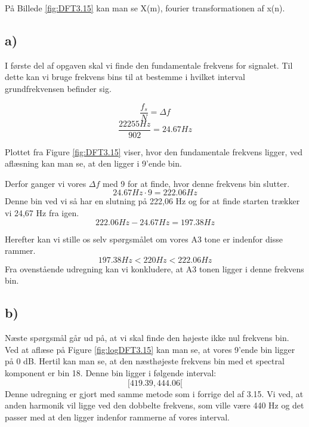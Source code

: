 \documentclass[../main.tex]{subfiles}
\begin{document}
På Billede \ref{fig:DFT3.15} kan man se X(m), fourier transformationen af x(n).

\subsection{a)}
I første del af opgaven skal vi finde den fundamentale frekvens for signalet.
Til dette kan vi bruge frekvens bins til at bestemme i hvilket interval grundfrekvensen befinder sig.

\[
    \frac{f_s}{N} = \Delta f
\]
\[
    \frac{22255 Hz}{902} = 24.67 Hz
\]

Plottet fra Figure \ref{fig:DFT3.15} viser, hvor den fundamentale frekvens ligger, ved aflæsning kan man se, at den ligger i 9'ende bin.

Derfor ganger vi vores $\Delta f$ med 9 for at finde, hvor denne frekvens bin slutter.
\[
    24.67 Hz \cdot 9 = 222.06 Hz
\]
Denne bin ved vi så har en slutning på 222,06 Hz og for at finde starten trækker vi 24,67 Hz fra igen.
\[
    222.06 Hz - 24.67 Hz = 197.38 Hz
\]

Herefter kan vi stille os selv spørgsmålet om vores A3 tone er indenfor disse rammer.
\[
    197.38 Hz < 220 Hz < 222.06 Hz
\]
Fra ovenstående udregning kan vi konkludere, at A3 tonen ligger i denne frekvens bin.

\subsection{b)}


Næste spørgsmål går ud på, at vi skal finde den højeste ikke nul frekvens bin.
Ved at aflæse på Figure \ref{fig:logDFT3.15} kan man se, at vores 9'ende bin ligger på 0 dB. Hertil kan man se, at den næsthøjeste
frekvens bin med et spectral komponent er bin 18. Denne bin ligger i følgende interval: 
\[[419.39 , 444.06[\] 
Denne udregning er gjort med samme metode som i forrige del af 3.15.
Vi ved, at anden harmonik vil ligge ved den dobbelte frekvens, som ville være 440 Hz og det passer med at den ligger indenfor rammerne af vores interval.
\end{document}
